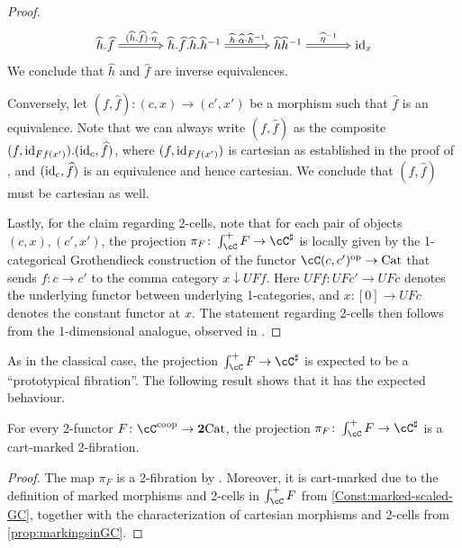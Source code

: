 \documentclass[11pt, dvipsnames]{amsart}
\begin{document}
\begin{proof}
        \[\begin{tikzcd}[cramped,column sep=18pt]
        	{\widehat{h}.\widehat{f}} && {\widehat{h}.\widehat{f}.\widehat{h}.\widehat{h}^{-1}} && {\widehat{h}\widehat{h}^{-1}} && {\id_x}
        	\arrow["{(\widehat{h}.\widehat{f})\cdot \widehat{\eta}}", Rightarrow, from=1-1, to=1-3]
        	\arrow["{\widehat{h}\cdot \widehat{\alpha}\cdot \widehat{h}^{-1}}", Rightarrow, from=1-3, to=1-5]
        	\arrow["{\widehat{\eta}^{-1}}", Rightarrow, from=1-5, to=1-7]
        \end{tikzcd}\]
        We conclude that $\widehat{h}$ and $\widehat{f}$ are inverse equivalences. 
	
        Conversely, let $(f,\widehat{f})\colon (c,x)\to(c',x')$ be a morphism such that $\widehat{f}$ is an equivalence. Note that we can always write $(f,\widehat{f})$ as the composite $(f,\mathrm{id}_{Ff(x')}).(\mathrm{id}_c, \widehat{f})$, where $(f,\mathrm{id}_{Ff(x')})$ is cartesian as established in the proof of \cite[Proposition 3.3.4]{Buckley2014}, and $(\mathrm{id}_c, \widehat{f})$ is an equivalence and hence cartesian. We conclude that $(f,\widehat{f})$ must be cartesian as well.
        
        Lastly, for the claim regarding 2-cells, note that for each pair of objects $(c,x),(c',x')$, the projection $\pi_F\colon\int_{\cC}^{+}F\to\cC^\sharp$ is locally given by the 1-categorical  Grothendieck construction of the functor $\cC(c,c')^{\mathrm{op}}\to\cat$ that sends $f\colon c\to c'$ to the comma category $x\downarrow UFf$. Here $UFf\colon UFc'\to UFc$ denotes the underlying functor between underlying 1-categories, and $x\colon [0]\to UFc$ denotes the constant functor at $x$.
            The statement regarding 2-cells then follows from the 1-dimensional analogue, observed in \cite[Remark 5.2]{mosersarazola2023model}.
        \end{proof}


        As in the classical case, the projection $\int^{+}_{\cC} F\to\cC^{\sharp}$ is expected to be a ``prototypical fibration''. The following result shows that it has the expected behaviour. 
        
        \begin{cor}\label{cor:projectionisfibrant}
            For every 2-functor $F\colon\cC^{\coop}\to\ttwocat$, the projection $\pi_F\colon \int^{+}_{\cC} F\to\cC^{\sharp}$ is a cart-marked 2-fibration.
        \end{cor}
        \begin{proof}
            The map $\pi_F$ is a 2-fibration by \cite[Proposition 3.3.4]{Buckley2014}. Moreover, it is cart-marked  due to the definition of marked morphisms and 2-cells in $\int^{+}_{\cC} F$ from \cref{Const:marked-scaled-GC}, together with the characterization of cartesian morphisms and 2-cells from \cref{prop:markingsinGC}. 
        \end{proof}
\end{document}
